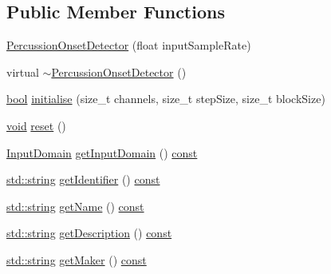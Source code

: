 \subsection*{Public Member Functions}
\begin{DoxyCompactItemize}
\item 
\hyperlink{class_percussion_onset_detector_a9f700579805ee5105758d847baab3511}{Percussion\+Onset\+Detector} (float input\+Sample\+Rate)
\item 
virtual \hyperlink{class_percussion_onset_detector_a99f833667cf8185e879d735216c7642b}{$\sim$\+Percussion\+Onset\+Detector} ()
\item 
\hyperlink{mac_2config_2i386_2lib-src_2libsoxr_2soxr-config_8h_abb452686968e48b67397da5f97445f5b}{bool} \hyperlink{class_percussion_onset_detector_a349c528260622308f3850bcda8a448ab}{initialise} (size\+\_\+t channels, size\+\_\+t step\+Size, size\+\_\+t block\+Size)
\item 
\hyperlink{sound_8c_ae35f5844602719cf66324f4de2a658b3}{void} \hyperlink{class_percussion_onset_detector_a9b1075e992cd9599764ef3881fb91d1a}{reset} ()
\item 
\hyperlink{class_vamp_1_1_plugin_a39cb7649d6dcc20e4cb1640cd55907bc}{Input\+Domain} \hyperlink{class_percussion_onset_detector_a4f6954267696ee5bfa7dd1c4a6cfa92a}{get\+Input\+Domain} () \hyperlink{getopt1_8c_a2c212835823e3c54a8ab6d95c652660e}{const} 
\item 
\hyperlink{test__lib_f_l_a_c_2format_8c_ab02026ad0de9fb6c1b4233deb0a00c75}{std\+::string} \hyperlink{class_percussion_onset_detector_a267c83a7533146c127e2c3be310e0154}{get\+Identifier} () \hyperlink{getopt1_8c_a2c212835823e3c54a8ab6d95c652660e}{const} 
\item 
\hyperlink{test__lib_f_l_a_c_2format_8c_ab02026ad0de9fb6c1b4233deb0a00c75}{std\+::string} \hyperlink{class_percussion_onset_detector_aa98f1ad061a11af98c054011a8844e6f}{get\+Name} () \hyperlink{getopt1_8c_a2c212835823e3c54a8ab6d95c652660e}{const} 
\item 
\hyperlink{test__lib_f_l_a_c_2format_8c_ab02026ad0de9fb6c1b4233deb0a00c75}{std\+::string} \hyperlink{class_percussion_onset_detector_a9061d189705802a48973a7ccab6360db}{get\+Description} () \hyperlink{getopt1_8c_a2c212835823e3c54a8ab6d95c652660e}{const} 
\item 
\hyperlink{test__lib_f_l_a_c_2format_8c_ab02026ad0de9fb6c1b4233deb0a00c75}{std\+::string} \hyperlink{class_percussion_onset_detector_a63d63f2cb7ea8d8b09d58cc13b541375}{get\+Maker} () \hyperlink{getopt1_8c_a2c212835823e3c54a8ab6d95c652660e}{const} 

\end{DoxyCompactItemize}
